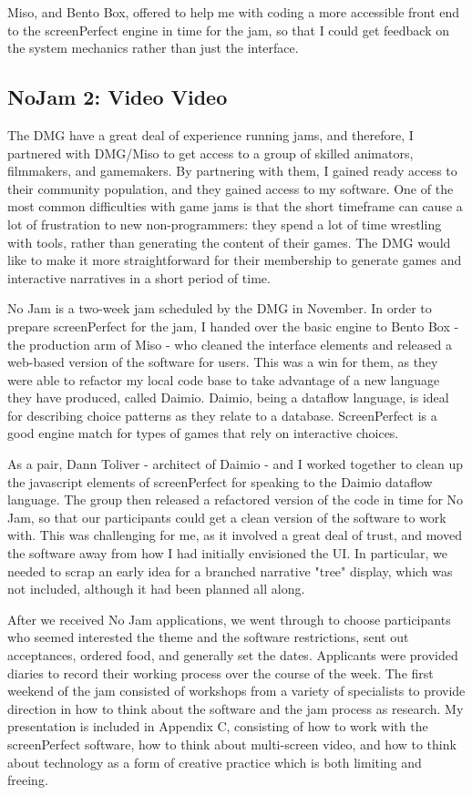 Miso, and Bento Box, offered to help me with coding a more accessible front end to the screenPerfect engine in time for the jam, so that I could get feedback on the system mechanics rather than just the interface.


\subsection{NoJam 2: Video Video}

The DMG have a great deal of experience running jams, and therefore, I partnered with DMG/Miso to get access to a group of skilled animators, filmmakers, and gamemakers. By partnering with them, I gained ready access to their community population, and they gained access to my software. One of the most common difficulties with game jams is that the short timeframe can cause a lot of frustration to new non-programmers: they spend a lot of time wrestling with tools, rather than generating the content of their games. The DMG would like to make it more straightforward for their membership to generate games and interactive narratives in a short period of time. 

No Jam is a two-week jam scheduled by the DMG in November. In order to prepare screenPerfect for the jam, I handed over the basic engine to Bento Box - the production arm of Miso - who cleaned the interface elements and released a web-based version of the software for users. This was a win for them, as they were able to refactor my local code base to take advantage of a new language they have produced, called Daimio. Daimio, being a dataflow language, is ideal for describing choice patterns as they relate to a database. ScreenPerfect is a good engine match for types of games that rely on interactive choices. 

As a pair, Dann Toliver - architect of Daimio - and I worked together to clean up the javascript elements of screenPerfect for speaking to the Daimio dataflow language. The group then released a refactored version of the code in time for No Jam, so that our participants could get a clean version of the software to work with. This was challenging for me, as it involved a great deal of trust, and moved the software away from how I had initially envisioned the UI. In particular, we needed to scrap an early idea for a branched narrative "tree" display, which was not included, although it had been planned all along.

After we received No Jam applications, we went through to choose participants who seemed interested the theme and the software restrictions, sent out acceptances, ordered food, and generally set the dates. Applicants were provided diaries to record their working process over the course of the week. The first weekend of the jam consisted of workshops from a variety of specialists to provide direction in how to think about the software and the jam process as research. My presentation is included in Appendix C, consisting of how to work with the screenPerfect software, how to think about multi-screen video, and how to think about technology as a form of creative practice which is both limiting and freeing. 

